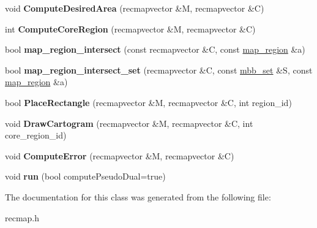\begin{DoxyCompactItemize}
void {\bfseries Compute\+Desired\+Area} (recmapvector \&M, recmapvector \&C)
\item 
\mbox{\label{classcrecmap_1_1RecMap_a59c91bbd4b9d9c5057b082099f1bf89b}} 
int {\bfseries Compute\+Core\+Region} (recmapvector \&M, recmapvector \&C)
\item 
\mbox{\label{classcrecmap_1_1RecMap_a18e096d369e0f4e4b2862af74367463d}} 
bool {\bfseries map\+\_\+region\+\_\+intersect} (const recmapvector \&C, const \hyperlink{structcrecmap_1_1map__region}{map\+\_\+region} \&a)
\item 
\mbox{\label{classcrecmap_1_1RecMap_af5a5ca00e627d3f893734fb92eac2372}} 
bool {\bfseries map\+\_\+region\+\_\+intersect\+\_\+set} (recmapvector \&C, const \hyperlink{structcrecmap_1_1mbb__set}{mbb\+\_\+set} \&S, const \hyperlink{structcrecmap_1_1map__region}{map\+\_\+region} \&a)
\item 
\mbox{\label{classcrecmap_1_1RecMap_a9e8e3f05f71a8442fa7b259894f440e7}} 
bool {\bfseries Place\+Rectangle} (recmapvector \&M, recmapvector \&C, int region\+\_\+id)
\item 
\mbox{\label{classcrecmap_1_1RecMap_ac5e3a03d15aea4cd9ec532157b9b8268}} 
void {\bfseries Draw\+Cartogram} (recmapvector \&M, recmapvector \&C, int core\+\_\+region\+\_\+id)
\item 
\mbox{\label{classcrecmap_1_1RecMap_a81f0c77733175eb5819fb072e2fffcd8}} 
void {\bfseries Compute\+Error} (recmapvector \&M, recmapvector \&C)
\item 
\mbox{\label{classcrecmap_1_1RecMap_ae330f4d8e60a5e45f76396d6c12cef1b}} 
void {\bfseries run} (bool compute\+Pseudo\+Dual=true)
\end{DoxyCompactItemize}


The documentation for this class was generated from the following file\+:\begin{DoxyCompactItemize}
\item 
recmap.\+h\end{DoxyCompactItemize}
